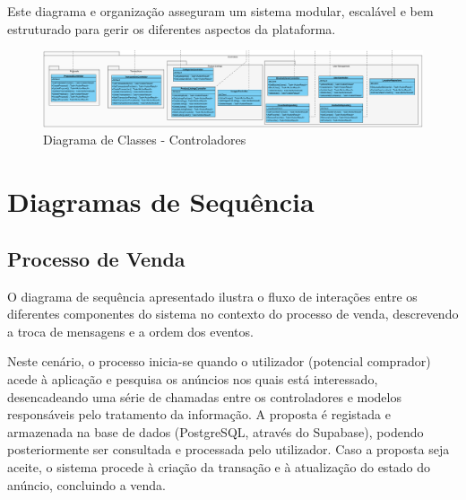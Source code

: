 \documentclass[a4paper, 12pt]{article} %
\begin{document}
Este diagrama e organização asseguram um sistema modular, escalável e bem estruturado para gerir os diferentes aspectos da plataforma.

\begin{figure}[ht]
	\centering
	\includegraphics[width=\textwidth]{../images/class-diagram-controllers.png}
	\caption{Diagrama de Classes - Controladores}
	\label{fig:class_diagram_controllers}
\end{figure}


\newpage
\section{Diagramas de Sequência}

\subsection{Processo de Venda}
O diagrama de sequência apresentado ilustra o fluxo de interações entre os diferentes componentes do sistema no contexto do processo de venda, descrevendo a troca de mensagens e a ordem dos eventos.

Neste cenário, o processo inicia-se quando o utilizador (potencial comprador) acede à aplicação e pesquisa os anúncios nos quais está interessado, desencadeando uma série de chamadas entre os controladores e modelos responsáveis pelo tratamento da informação. A proposta é registada e armazenada na base de dados (PostgreSQL, através do Supabase), podendo posteriormente ser consultada e processada pelo utilizador. Caso a proposta seja aceite, o sistema procede à criação da transação e à atualização do estado do anúncio, concluindo a venda.
\end{document}

